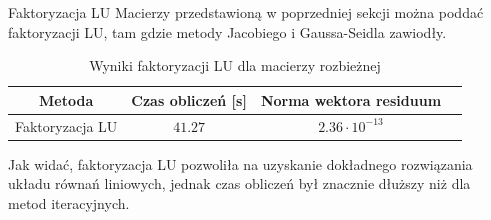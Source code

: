 \documentclass{article}
\begin{document}
\begin{section}{Faktoryzacja LU}
    Macierzy przedstawioną w poprzedniej sekcji można poddać faktoryzacji LU, tam gdzie metody Jacobiego i Gaussa-Seidla
    zawiodły.
    \begin{table}[H]
        \centering
        \begin{tabular}{|c|c|c|c|}
            \hline
            Metoda & Czas obliczeń [s] & Norma wektora residuum \\
            \hline
            Faktoryzacja LU & $41.27$ & $2.36\cdot10^{-13}$ \\
            \hline
        \end{tabular}
        \caption{Wyniki faktoryzacji LU dla macierzy rozbieżnej}
    \end{table}
    Jak widać, faktoryzacja LU pozwoliła na uzyskanie dokładnego rozwiązania układu równań liniowych, jednak
    czas obliczeń był znacznie dłuższy niż dla metod iteracyjnych.
\end{section}
\end{document}
